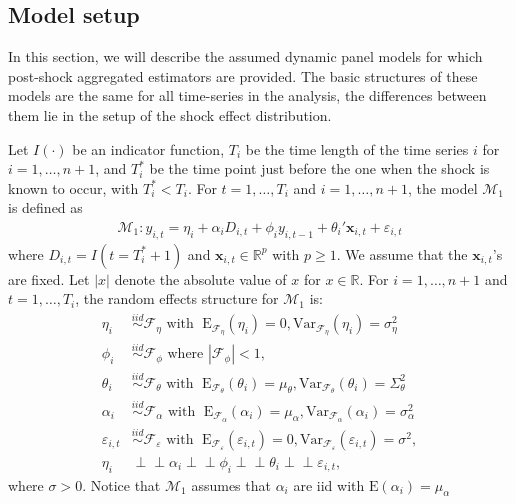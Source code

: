 \documentclass[11pt,3p,review,authoryear]{elsarticle}
\newcommand{\R}{\mathbb{R}}
\newcommand{\x}{\textbf{x}}
\def\mbf#1{\mathbf{#1}} %
\newcommand{\simiid}{\stackrel{iid}{\sim}} %
\newcommand{\indep}{\perp \!\!\! \perp } %
\def\mrm#1{\mathrm{#1}} %
\newcommand{\reals}{\mathbb{R}} %
\def\mc#1{\mathcal{#1}} %
\def\E#1{\mathrm{E}(#1)} %
\theoremstyle{definition}
\begin{document}
\subsection{Model setup}

\label{modelsetup}

In this section, we will describe the assumed dynamic panel models for which 
post-shock aggregated estimators are provided. The basic structures of these models 
are the same for all time-series in the analysis, the differences between them lie in the setup of the shock effect distribution.

Let $I(\cdot)$ be an indicator function, $T_i$ be the time length of the time series $i$ for $i = 1, \ldots, n+1$, and $T_i^*$ be the time point just before the one when the shock is known to occur, with $T_i^* < T_i$.  For $t= 1, \ldots, T_i$ and $i = 1, \ldots, n+1$, the model $\mc{M}_1$ is defined as
\begin{align}
\mc{M}_1 \colon y_{i,t} =\eta_i +\alpha_i D_{i,t} + \phi_i y_{i, t-1} + \theta_i'\mbf{x}_{i,t} + \varepsilon_{i,t}\label{equation1}
\end{align}
 where $D_{i,t} = I(t = T_i^* + 1)$ 
and $\x_{i,t} \in \R^{p}$ with $p \geq 1$.  We assume that the 
$\mbf{x}_{i,t}$'s are fixed. Let $|x|$ denote the absolute value of $x$ for $x\in \reals$. For $i = 1, \ldots, n+1$ and $t=1, \ldots, T_i$, the random effects structure for $\mc{M}_1$ is:
\begin{align*}
  \eta_i &\simiid \mc{F}_{\eta} \text{ with }  \; \mrm{E}_{\mc{F}_{\eta}}(\eta_i) = 0, \mrm{Var}_{\mc{F}_{\eta}}(\eta_i)  = \sigma^2_{\eta}\\
  \phi_i &\simiid \mc{F}_{\phi} \text{ where } |\mc{F}_{\phi}| < 1, \\
   \theta_i &\simiid \mc{F}_{\theta} \text{ with }  \; \mrm{E}_{\mc{F}_{\theta}}(\theta_i) = \mu_{\theta}, \mrm{Var}_{\mc{F}_{\theta}}(\theta_i)  = \Sigma^2_{\theta} \\
\alpha_i &\simiid \mc{F}_{\alpha} \text{ with }  \; \mrm{E}_{\mc{F}_{\alpha}}(\alpha_i) = \mu_{\alpha}, \mrm{Var}_{\mc{F}_{\alpha}}(\alpha_i)  = \sigma^2_{\alpha}  \\
\varepsilon_{i,t} & \simiid  \mc{F}_{\varepsilon} \text{ with }  \; \mrm{E}_{\mc{F}_{\varepsilon}}(\varepsilon_{i,t}) = 0, \mrm{Var}_{\mc{F}_{\varepsilon}}(\varepsilon_{i,t})  = \sigma^2  ,  \\
\eta_i &\indep  \alpha_i \indep \phi_i \indep \theta_i \indep \varepsilon_{i,t},
\end{align*}
where $\sigma > 0$. Notice that $\mc{M}_1$ assumes that $\alpha_i$ are iid with $\E{\alpha_i}=\mu_{\alpha}$ 
\end{document}
